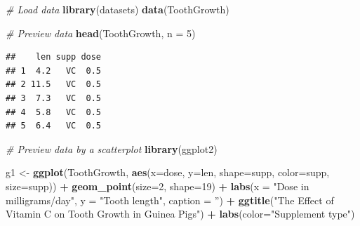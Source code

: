 \documentclass[
  landscape]{article}
\newenvironment{Shaded}{\begin{snugshade}}{\end{snugshade}}
\newcommand{\CommentTok}[1]{\textcolor[rgb]{0.56,0.35,0.01}{\textit{#1}}}
\newcommand{\DataTypeTok}[1]{\textcolor[rgb]{0.13,0.29,0.53}{#1}}
\newcommand{\DecValTok}[1]{\textcolor[rgb]{0.00,0.00,0.81}{#1}}
\newcommand{\KeywordTok}[1]{\textcolor[rgb]{0.13,0.29,0.53}{\textbf{#1}}}
\newcommand{\NormalTok}[1]{#1}
\newcommand{\OperatorTok}[1]{\textcolor[rgb]{0.81,0.36,0.00}{\textbf{#1}}}
\newcommand{\StringTok}[1]{\textcolor[rgb]{0.31,0.60,0.02}{#1}}
\begin{document}
\begin{Shaded}
\begin{Highlighting}[]
\CommentTok{# Load data}
\KeywordTok{library}\NormalTok{(datasets)}
\KeywordTok{data}\NormalTok{(ToothGrowth)}

\CommentTok{# Preview data}
\KeywordTok{head}\NormalTok{(ToothGrowth, }\DataTypeTok{n =} \DecValTok{5}\NormalTok{)}
\end{Highlighting}
\end{Shaded}

\begin{verbatim}
##    len supp dose
## 1  4.2   VC  0.5
## 2 11.5   VC  0.5
## 3  7.3   VC  0.5
## 4  5.8   VC  0.5
## 5  6.4   VC  0.5
\end{verbatim}

\begin{Shaded}
\begin{Highlighting}[]
\CommentTok{# Preview data by a scatterplot}
\KeywordTok{library}\NormalTok{(ggplot2)}

\NormalTok{g1 <-}\StringTok{ }\KeywordTok{ggplot}\NormalTok{(ToothGrowth, }\KeywordTok{aes}\NormalTok{(}\DataTypeTok{x=}\NormalTok{dose, }\DataTypeTok{y=}\NormalTok{len, }\DataTypeTok{shape=}\NormalTok{supp, }\DataTypeTok{color=}\NormalTok{supp, }\DataTypeTok{size=}\NormalTok{supp)) }\OperatorTok{+}
\StringTok{    }\KeywordTok{geom_point}\NormalTok{(}\DataTypeTok{size=}\DecValTok{2}\NormalTok{, }\DataTypeTok{shape=}\DecValTok{19}\NormalTok{) }\OperatorTok{+}
\StringTok{    }\KeywordTok{labs}\NormalTok{(}\DataTypeTok{x =} \StringTok{"Dose in milligrams/day"}\NormalTok{,}
         \DataTypeTok{y =} \StringTok{"Tooth length"}\NormalTok{,}
         \DataTypeTok{caption =} \StringTok{''}\NormalTok{) }\OperatorTok{+}\StringTok{ }
\StringTok{    }\KeywordTok{ggtitle}\NormalTok{(}\StringTok{"The Effect of Vitamin C on }
\StringTok{Tooth Growth in Guinea Pigs"}\NormalTok{) }\OperatorTok{+}
\StringTok{    }\KeywordTok{labs}\NormalTok{(}\DataTypeTok{color=}\StringTok{"Supplement}
\StringTok{type"}\NormalTok{) }


\end{Highlighting}
\end{Shaded}
\end{document}
